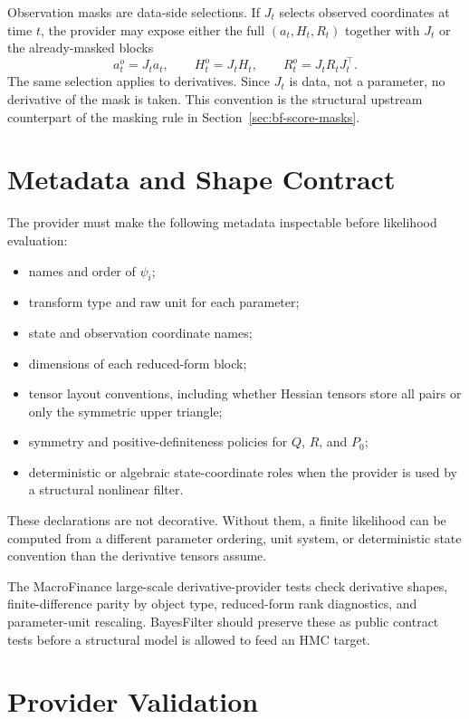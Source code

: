 Observation masks are data-side selections.  If $J_t$ selects observed
coordinates at time $t$, the provider may expose either the full
$(a_t,H_t,R_t)$ together with $J_t$ or the already-masked blocks
\[
  a_t^o=J_ta_t,\qquad H_t^o=J_tH_t,\qquad R_t^o=J_tR_tJ_t^\top .
\]
The same selection applies to derivatives.  Since $J_t$ is data, not a
parameter, no derivative of the mask is taken.  This convention is the structural
upstream counterpart of the masking rule in
Section~\ref{sec:bf-score-masks}.

\section{Metadata and Shape Contract}
\label{sec:bf-structural-metadata-shapes}

The provider must make the following metadata inspectable before likelihood
evaluation:
\begin{itemize}
  \item names and order of $\psi_i$;
  \item transform type and raw unit for each parameter;
  \item state and observation coordinate names;
  \item dimensions of each reduced-form block;
  \item tensor layout conventions, including whether Hessian tensors store all
    pairs or only the symmetric upper triangle;
  \item symmetry and positive-definiteness policies for $Q$, $R$, and $P_0$;
  \item deterministic or algebraic state-coordinate roles when the provider is
    used by a structural nonlinear filter.
\end{itemize}
These declarations are not decorative.  Without them, a finite likelihood can be
computed from a different parameter ordering, unit system, or deterministic
state convention than the derivative tensors assume.

The MacroFinance large-scale derivative-provider tests check derivative shapes,
finite-difference parity by object type, reduced-form rank diagnostics, and
parameter-unit rescaling.  BayesFilter should preserve these as public contract
tests before a structural model is allowed to feed an HMC target.

\section{Provider Validation}
\label{sec:bf-structural-provider-validation}

